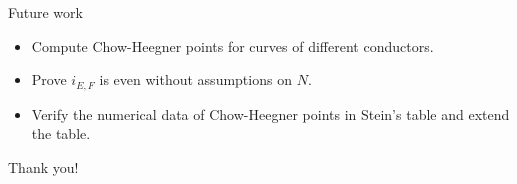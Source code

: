 \documentclass[handout]{beamer}
\begin{document}
\begin{frame}{Future work}

\begin{itemize}
\item Compute Chow-Heegner points for curves of different conductors. 
\item Prove $i_{E,F}$ is even without assumptions on $N$. 
\item Verify the numerical data of Chow-Heegner points in Stein's table and extend the table.
\end{itemize}

\end{frame}

\begin{frame}
\Huge{\centerline{Thank you!}}
\end{frame}
\end{document}
